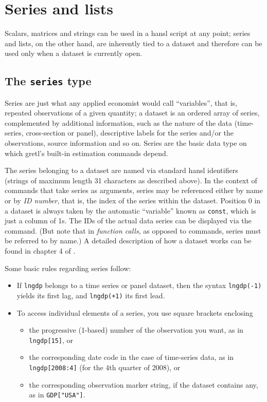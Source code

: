 \chapter{Series and lists}
\label{chap:series-etc}

Scalars, matrices and strings can be used in a hansl script at any
point; series and lists, on the other hand, are inherently tied to a
dataset and therefore can be used only when a dataset is currently
open.

\section{The \texttt{series} type}
\label{sec:series}
 
Series are just what any applied economist would call ``variables'',
that is, repeated observations of a given quantity; a dataset is an
ordered array of series, complemented by additional information, such
as the nature of the data (time-series, cross-section or panel),
descriptive labels for the series and/or the observations, source
information and so on. Series are the basic data type on which gretl's
built-in estimation commands depend.

The series belonging to a dataset are named via standard hansl
identifiers (strings of maximum length 31 characters as described
above). In the context of commands that take series as arguments,
series may be referenced either by name or by \emph{ID number}, that
is, the index of the series within the dataset. Position 0 in a
dataset is always taken by the automatic ``variable'' known as
\texttt{const}, which is just a column of 1s. The IDs of the actual
data series can be displayed via the  command. (But note
that in \textit{function calls}, as opposed to commands, series must
be referred to by name.)  A detailed description of how a dataset
works can be found in chapter 4 of \GUG.

Some basic rules regarding series follow:
\begin{itemize}
\item If \texttt{lngdp} belongs to a time series or panel dataset,
  then the syntax \texttt{lngdp(-1)} yields its first lag, and
  \texttt{lngdp(+1)} its first lead.
\item To access individual elements of a series, you use square
  brackets enclosing
  \begin{itemize}
  \item the progressive (1-based) number of the observation you want,
    as in \verb|lngdp[15]|, or
  \item the corresponding date code in the case of time-series data,
    as in \verb|lngdp[2008:4]| (for the 4th quarter of 2008), or
  \item the corresponding observation marker string, if the dataset
    contains any, as in \verb|GDP["USA"]|.
  \end{itemize}
\end{itemize}

